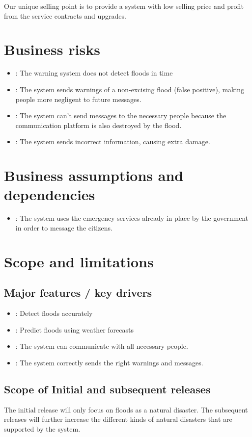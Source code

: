 Our unique selling point is to provide a system with low selling price and profit from the service contracts and upgrades.

\section{Business risks}
\begin{itemize}
	\item {}: The warning system does not detect floods in time
	\item {}: The system sends warnings of a non-excising flood (false positive), making people more negligent to future messages.
	\item {}: The system can't send messages to the necessary people because the communication platform is also destroyed by the flood.
	\item {}: The system sends incorrect information, causing extra damage.
\end{itemize}

\section{Business assumptions and dependencies}
\begin{itemize}
	\item {}: The system uses the emergency services already in place by the government in order to message the citizens.
	
\end{itemize}

\section{Scope and limitations}
\subsection{Major features / key drivers}
\begin{itemize}
	\item {}: Detect floods accurately
	\item {}: Predict floods using weather forecasts
	\item {}: The system can communicate with all necessary people.
	\item {}: The system correctly sends the right warnings and messages.
		
\end{itemize}
\subsection{Scope of Initial and subsequent releases}
The initial release will only focus on floods as a natural disaster. The subsequent releases will further increase the different kinds of natural disasters that are supported by the system.\\

